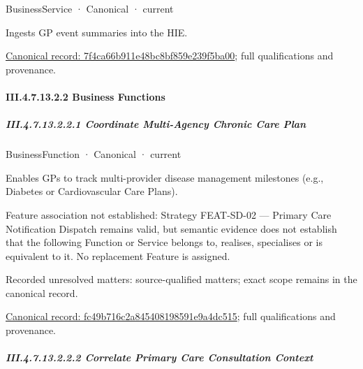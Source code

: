 \label{element:7f4ca66b911e48bc8bf859e239f5ba00}
{\small BusinessService · Canonical · current}\par

Ingests GP event summaries into the HIE.


{\footnotesize \href{../../../../continuum/business/business-service/7f4ca66b911e48bc8bf859e239f5ba00.md}{Canonical record: 7f4ca66b911e48bc8bf859e239f5ba00}; full qualifications and provenance.}\par
\paragraph*{III.4.7.13.2.2 Business Functions}
\label{navigation:III.4.7.13.2.2}

\subparagraph*{III.4.7.13.2.2.1 Coordinate Multi-Agency Chronic Care Plan}
\label{navigation:III.4.7.13.2.2.1}

\label{element:fc49b716c2a845408198591e9a4dc515}
{\small BusinessFunction · Canonical · current}\par

Enables GPs to track multi-provider disease management milestones (e.g., Diabetes or Cardiovascular Care Plans).



Feature association not established: Strategy FEAT-SD-02 — Primary Care Notification Dispatch remains valid, but semantic evidence does not establish that the following Function or Service belongs to, realises, specialises or is equivalent to it. No replacement Feature is assigned.


{\small Recorded unresolved matters: source-qualified matters; exact scope remains in the canonical record.}\par
{\footnotesize \href{../../../../continuum/business/business-function/fc49b716c2a845408198591e9a4dc515.md}{Canonical record: fc49b716c2a845408198591e9a4dc515}; full qualifications and provenance.}\par
\subparagraph*{III.4.7.13.2.2.2 Correlate Primary Care Consultation Context}
\label{navigation:III.4.7.13.2.2.2}

